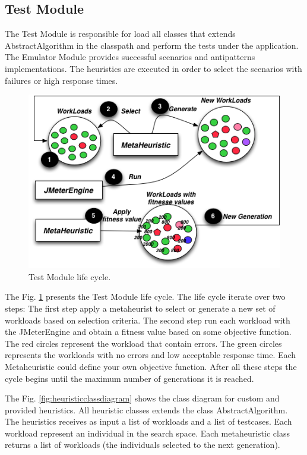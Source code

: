 \subsection{Test Module}

The Test Module is responsible for load all classes that extends AbstractAlgorithm in the classpath and perform the tests under the application. The Emulator Module provides successful scenarios and antipatterns implementations. The heuristics are executed in order to select the scenarios with failures or high response times. 

\begin{figure}[h]
\begin{minipage}{.5\textwidth}
\centering
\includegraphics[width=1\textwidth]{./images/step2.png}
\caption{Test Module life cycle.}
\label{fig:step2}
\end{minipage}
\end{figure} 

The Fig. \ref{fig:step2} presents the Test Module life cycle. The life cycle iterate over two steps: The first step apply a metaheurist to select or generate a new set of workloads based on selection criteria. The second step run each workload with the JMeterEngine and obtain a fitness value based on some objective function. The red circles represent the workload that contain errors. The green circles represents the workloads with no errors and low acceptable response time.  Each Metaheuristic could define your own objective function. After all these steps the cycle begins until the maximum number of generations it is reached. 

The Fig. \ref{fig:heuristicclassdiagram} shows the  class diagram for custom and provided heuristics. All heuristic classes extends the class AbstractAlgorithm. The heuristics receives  as input a  list of workloads and a list of testcases. Each workload represent an individual in the search space. Each metaheuristic class returns a list of workloads (the individuals selected to the next generation). 




